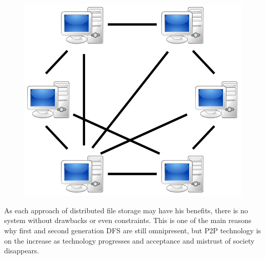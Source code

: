 \begin{figure}
\begin{minipage}{.33\textwidth}
		\label{2nd_gen_dfs}
	\end{minipage}
	\begin{minipage}{.33\textwidth}
		\centering
		\includegraphics[scale=0.175]{Talk5/3rd_gen_dfs.PNG}
		\label{3rd_gen_dfs}
	\end{minipage}
\end{figure}

As each approach of distributed file storage may have his benefits, there is no system without drawbacks or even constraints. This is one of the main reasons why first and second generation DFS are still omnipresent, but P2P technology is on the increase as technology progresses and acceptance and mistrust of society disappears.

